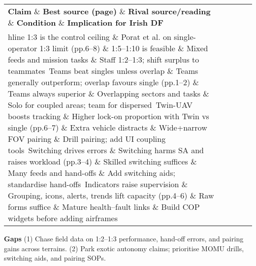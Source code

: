  
\begin{tabular}{p{3.2cm}p{4.2cm}p{3.6cm}p{3.2cm}p{4.2cm}}
	\textbf{Claim} \& \textbf{Best source (page)} \& \textbf{Rival source/reading} \& \textbf{Condition} \& \textbf{Implication for Irish DF}\\hline
	1:3 is the control ceiling \& Porat et al. on single-operator 1:3 limit (pp.6–8) \& 1:5–1:10 is feasible \& Mixed feeds and mission tasks \& Staff 1:2–1:3; shift surplus to teammates\
	Teams beat singles unless overlap \& Teams generally outperform; overlap favours single (pp.1–2) \& Teams always superior \& Overlapping sectors and tasks \& Solo for coupled areas; team for dispersed\
	Twin-UAV boosts tracking \& Higher lock-on proportion with Twin vs single (pp.6–7) \& Extra vehicle distracts \& Wide+narrow FOV pairing \& Drill pairing; add UI coupling tools\
	Switching drives errors \& Switching harms SA and raises workload (pp.3–4) \& Skilled switching suffices \& Many feeds and hand-offs \& Add switching aids; standardise hand-offs\
	Indicators raise supervision \& Grouping, icons, alerts, trends lift capacity (pp.4–6) \& Raw forms suffice \& Mature health–fault links \& Build COP widgets before adding airframes\
\end{tabular}

\textbf{Gaps}
(1) Chase field data on 1:2–1:3 performance, hand-off errors, and pairing gains across terrains.
(2) Park exotic autonomy claims; prioritise MOMU drills, switching aids, and pairing SOPs.

\parencite{ZAJAC_2025}

